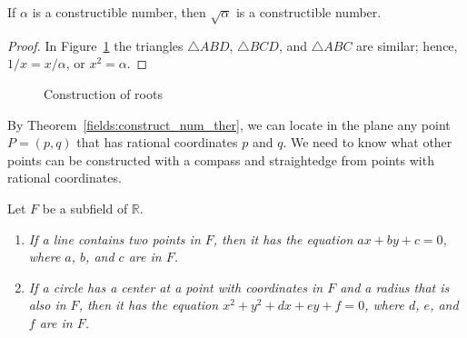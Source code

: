 \begin{lemma}
If $\alpha$ is a constructible number, then $\sqrt{\alpha}$ is a
constructible number.
\end{lemma}


\begin{proof}
In Figure~\ref{Root} the triangles $\triangle ABD$, $\triangle BCD$,
and $\triangle ABC$ are similar; hence, $1 /x = x / \alpha$, or $x^2 =
\alpha$. 
\end{proof}

\begin{figure}[htb]
\begin{center}

\end{center}
\caption{Construction of roots}
\label{Root}
\end{figure}



\medskip


By Theorem~\ref{fields:construct_num_ther}, we can locate in the plane any point $P =( p, q)$
that has rational coordinates $p$ and $q$. We need to know what other
points can be constructed with a compass and straightedge from points
with rational coordinates.  


\begin{lemma}
Let $F$ be a subfield of ${\mathbb R}$.
\begin{enumerate}

\rm \item \it
If a line contains two points in $F$, then it has the equation $a x + by
+ c = 0$, where $a$, $b$, and $c$ are in $F$.

\rm \item \it
If a circle has a center at a point with coordinates in $F$ and a radius
that is also in $F$, then it has the equation $x^2 + y^2 + d x + e y
+ f = 0$, where $d$, $e$, and $f$ are in $F$.

\end{enumerate}
\end{lemma}


